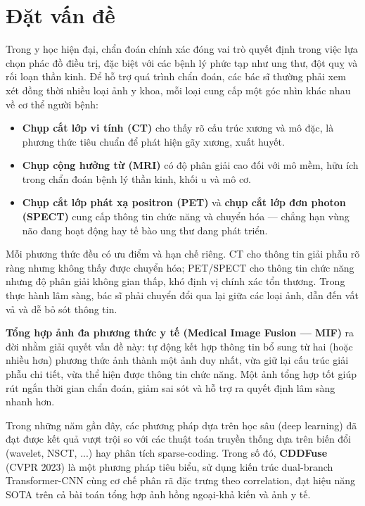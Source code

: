 \section{Đặt vấn đề}
\label{sec:problem}

Trong y học hiện đại, chẩn đoán chính xác đóng vai trò quyết định trong việc lựa chọn phác đồ điều trị, đặc biệt với các bệnh lý phức tạp như ung thư, đột quỵ và rối loạn thần kinh. Để hỗ trợ quá trình chẩn đoán, các bác sĩ thường phải xem xét đồng thời nhiều loại ảnh y khoa, mỗi loại cung cấp một góc nhìn khác nhau về cơ thể người bệnh:

\begin{itemize}\itemsep2pt
    \item \textbf{Chụp cắt lớp vi tính (CT)} cho thấy rõ cấu trúc xương và mô đặc, là phương thức tiêu chuẩn để phát hiện gãy xương, xuất huyết.
    \item \textbf{Chụp cộng hưởng từ (MRI)} có độ phân giải cao đối với mô mềm, hữu ích trong chẩn đoán bệnh lý thần kinh, khối u và mô cơ.
    \item \textbf{Chụp cắt lớp phát xạ positron (PET)} và \textbf{chụp cắt lớp đơn photon (SPECT)} cung cấp thông tin chức năng và chuyển hóa --- chẳng hạn vùng não đang hoạt động hay tế bào ung thư đang phát triển.
\end{itemize}

Mỗi phương thức đều có ưu điểm và hạn chế riêng. CT cho thông tin giải phẫu rõ ràng nhưng không thấy được chuyển hóa; PET/SPECT cho thông tin chức năng nhưng độ phân giải không gian thấp, khó định vị chính xác tổn thương. Trong thực hành lâm sàng, bác sĩ phải chuyển đổi qua lại giữa các loại ảnh, dẫn đến vất vả và dễ bỏ sót thông tin.

\textbf{Tổng hợp ảnh đa phương thức y tế (Medical Image Fusion --- MIF)} ra đời nhằm giải quyết vấn đề này: tự động kết hợp thông tin bổ sung từ hai (hoặc nhiều hơn) phương thức ảnh thành một ảnh duy nhất, vừa giữ lại cấu trúc giải phẫu chi tiết, vừa thể hiện được thông tin chức năng. Một ảnh tổng hợp tốt giúp rút ngắn thời gian chẩn đoán, giảm sai sót và hỗ trợ ra quyết định lâm sàng nhanh hơn.

Trong những năm gần đây, các phương pháp dựa trên học sâu (deep learning) đã đạt được kết quả vượt trội so với các thuật toán truyền thống dựa trên biến đổi (wavelet, NSCT, ...) hay phân tích sparse-coding. Trong số đó, \textbf{CDDFuse} \cite{zhao2023cddfuse} (CVPR 2023) là một phương pháp tiêu biểu, sử dụng kiến trúc dual-branch Transformer-CNN cùng cơ chế phân rã đặc trưng theo correlation, đạt hiệu năng SOTA trên cả bài toán tổng hợp ảnh hồng ngoại-khả kiến và ảnh y tế.

